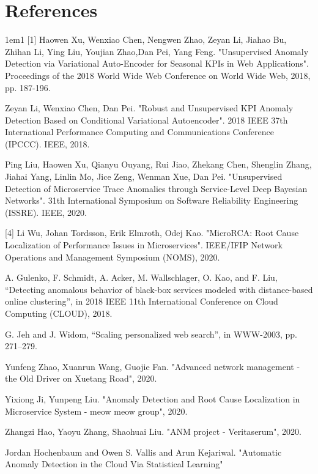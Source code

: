 \documentclass[12pt]{article}
\begin{document}
\section*{References}
\begin{hangparas}{1em}{1}
[1] Haowen Xu,  Wenxiao  Chen, Nengwen Zhao,  Zeyan  Li, Jiahao  Bu, Zhihan  Li,  Ying Liu,  Youjian Zhao,Dan  Pei, Yang Feng. "Unsupervised Anomaly Detection via Variational Auto-Encoder for Seasonal KPIs in Web Applications". Proceedings of the 2018 World Wide Web Conference on World Wide Web, 2018, pp. 187-196.

\smallskip\smallskip
[2] Zeyan Li, Wenxiao Chen, Dan Pei. "Robust and Unsupervised KPI Anomaly Detection Based on Conditional Variational Autoencoder". 2018 IEEE 37th International Performance Computing and Communications Conference (IPCCC). IEEE, 2018.

\smallskip\smallskip
[3] Ping Liu, Haowen Xu, Qianyu Ouyang, Rui Jiao, Zhekang Chen, Shenglin Zhang, Jiahai Yang, Linlin Mo, Jice Zeng, Wenman Xue, Dan Pei. "Unsupervised Detection of Microservice Trace Anomalies through Service-Level Deep Bayesian Networks". 31th International Symposium on Software Reliability Engineering (ISSRE). IEEE, 2020.


[4] Li Wu, Johan Tordsson, Erik Elmroth, Odej Kao. "MicroRCA: Root Cause Localization of Performance Issues in Microservices". IEEE/IFIP Network Operations and Management Symposium (NOMS), 2020. 

\smallskip\smallskip
[5] A. Gulenko, F. Schmidt, A. Acker, M. Wallschlager, O. Kao, and F. Liu, “Detecting anomalous behavior of black-box services modeled with distance-based online clustering”, in 2018 IEEE 11th International Conference on Cloud Computing (CLOUD), 2018.

\smallskip\smallskip
[6] G. Jeh and J. Widom, “Scaling personalized web search”, in WWW-2003, pp. 271–279.

\smallskip\smallskip
[7] Yunfeng Zhao, Xuanrun Wang, Guojie Fan. "Advanced network management - the Old Driver on Xuetang Road", 2020. 

\smallskip\smallskip
[8] Yixiong Ji, Yunpeng Liu. "Anomaly Detection and Root Cause Localization in Microservice System - meow meow group", 2020.

\smallskip\smallskip
[9] Zhangzi Hao, Yaoyu Zhang, Shaohuai Liu. "ANM project - Veritaserum", 2020. 

\smallskip\smallskip\noindent
[10] Jordan Hochenbaum and Owen S. Vallis and Arun Kejariwal. "Automatic Anomaly Detection in the Cloud Via Statistical Learning"

\vfill %
\break

\end{hangparas}
\end{document}
